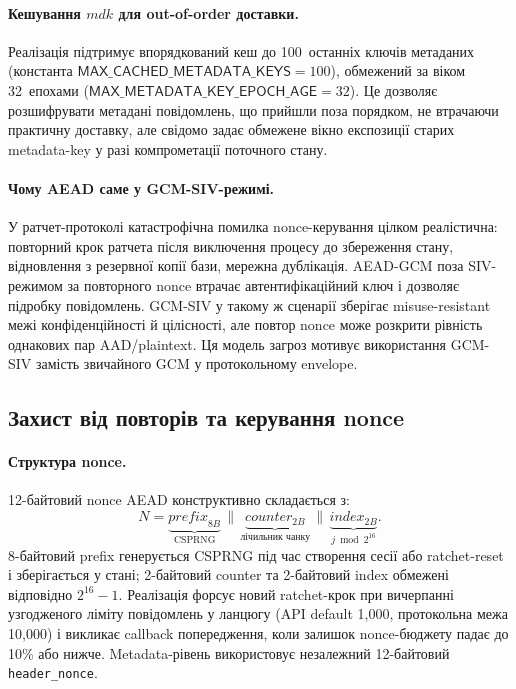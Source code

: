 \documentclass[11pt,a4paper]{article}
\theoremstyle{definition}
\newcommand{\concat}{\ensuremath{\,\|\,}}
\newcommand{\mdk}{\ensuremath{\mathit{mdk}}}
\begin{document}
\paragraph{Кешування $\mdk$ для out-of-order доставки.}
Реалізація підтримує впорядкований кеш до 100~останніх ключів
метаданих (константа $\textsf{MAX\_CACHED\_METADATA\_KEYS} = 100$),
обмежений за віком 32~епохами
($\textsf{MAX\_METADATA\_KEY\_EPOCH\_AGE} = 32$). Це дозволяє
розшифрувати метадані повідомлень, що прийшли поза порядком, не
втрачаючи практичну доставку, але свідомо задає обмежене вікно експозиції
старих metadata-key у разі компрометації поточного стану.

\paragraph{Чому AEAD саме у GCM-SIV-режимі.}
У ратчет-протоколі катастрофічна помилка nonce-керування цілком
реалістична: повторний крок ратчета після виключення процесу до
збереження стану, відновлення з резервної копії бази, мережна
дублікація. AEAD-GCM поза SIV-режимом за повторного nonce втрачає
автентифікаційний ключ і дозволяє підробку повідомлень. GCM-SIV
у такому ж сценарії зберігає misuse-resistant межі конфіденційності й
цілісності, але повтор nonce може розкрити рівність однакових пар
AAD/plaintext. Ця модель загроз мотивує використання GCM-SIV замість
звичайного GCM у протокольному envelope.

\subsection{Захист від повторів та керування nonce}\label{sec:replay}\label{sec:nonce}

\paragraph{Структура nonce.}
12-байтовий nonce AEAD конструктивно складається з:
\begin{equation}\label{eq:nonce-layout}
  N = \underbrace{\mathit{prefix}_{8B}}_{\text{CSPRNG}}
      \concat \underbrace{\mathit{counter}_{2B}}_{\text{лічильник чанку}}
      \concat \underbrace{\mathit{index}_{2B}}_{j \bmod 2^{16}}.
\end{equation}
8-байтовий prefix генерується CSPRNG під час створення сесії або
ratchet-reset і зберігається у стані; 2-байтовий counter та 2-байтовий
index обмежені відповідно $2^{16}-1$. Реалізація форсує новий
ratchet-крок при вичерпанні узгодженого ліміту повідомлень у ланцюгу
(API default 1{,}000, протокольна межа 10{,}000)
і викликає callback попередження, коли залишок nonce-бюджету падає до
10\% або нижче. Metadata-рівень використовує незалежний 12-байтовий
\texttt{header\_nonce}.
\end{document}
